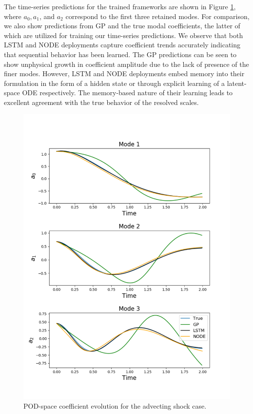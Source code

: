 \documentclass[preprint,12pt]{elsarticle}
\begin{document}
The time-series predictions for the trained frameworks are shown in Figure \ref{Figure3}, where $a_0, a_1$, and $a_2$ correspond to the first three retained modes. For  comparison, we also show predictions from GP and the true modal coefficients, the latter of which are utilized for training our time-series predictions. We observe that both LSTM and NODE deployments capture coefficient trends accurately indicating that sequential behavior has been learned. The GP predictions can be seen to show unphysical growth in coefficient amplitude due to the lack of presence of the finer modes. However, LSTM and NODE deployments embed memory into their formulation in the form of a hidden state or through explicit learning of a latent-space ODE respectively. The memory-based nature of their learning leads to excellent agreement with the true behavior of the resolved scales.

\begin{figure}
	\centering
	\includegraphics[width=\textwidth]{Figure_4.pdf}
	\caption{POD-space coefficient evolution for the advecting shock case.}
	\label{Figure3}
\end{figure}
\end{document}
